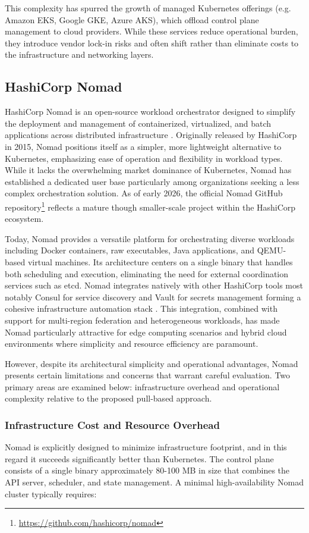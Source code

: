This complexity has spurred the growth of managed Kubernetes offerings (e.g. Amazon EKS, Google GKE, Azure AKS), which offload control plane management to cloud providers. While these services reduce operational burden, they introduce vendor lock-in risks and often shift rather than eliminate costs to the infrastructure and networking layers.

\subsection{HashiCorp Nomad}

HashiCorp Nomad is an open-source workload orchestrator designed to simplify the deployment and management of containerized, virtualized, and batch applications across distributed infrastructure \cite{nomad_docs}. Originally released by HashiCorp in 2015, Nomad positions itself as a simpler, more lightweight alternative to Kubernetes, emphasizing ease of operation and flexibility in workload types. While it lacks the overwhelming market dominance of Kubernetes, Nomad has established a dedicated user base particularly among organizations seeking a less complex orchestration solution. As of early 2026, the official Nomad GitHub repository\footnote{\url{https://github.com/hashicorp/nomad}} reflects a mature though smaller-scale project within the HashiCorp ecosystem.

Today, Nomad provides a versatile platform for orchestrating diverse workloads including Docker containers, raw executables, Java applications, and QEMU-based virtual machines. Its architecture centers on a single binary that handles both scheduling and execution, eliminating the need for external coordination services such as etcd. Nomad integrates natively with other HashiCorp tools most notably Consul for service discovery and Vault for secrets management forming a cohesive infrastructure automation stack \cite{nomad_docs}. This integration, combined with support for multi-region federation and heterogeneous workloads, has made Nomad particularly attractive for edge computing scenarios and hybrid cloud environments where simplicity and resource efficiency are paramount.

However, despite its architectural simplicity and operational advantages, Nomad presents certain limitations and concerns that warrant careful evaluation. Two primary areas are examined below: infrastructure overhead and operational complexity relative to the proposed pull-based approach.

\subsubsection{Infrastructure Cost and Resource Overhead}
Nomad is explicitly designed to minimize infrastructure footprint, and in this regard it succeeds significantly better than Kubernetes. The control plane consists of a single binary approximately 80-100 MB in size that combines the API server, scheduler, and state management. A minimal high-availability Nomad cluster typically requires:

